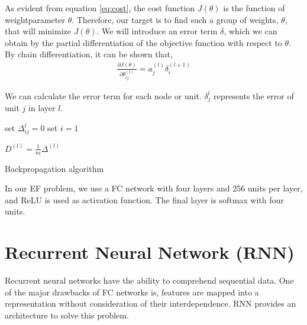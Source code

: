 As evident from equation \ref{eq:cost}, the cost function $J(\theta)$ is the function of weightparameter $\theta$. Therefore, our target is to find such a group of weights, $\theta$, that will minimize $J(\theta)$. We will introduce an error term $\delta$, which we can obtain by the partial differentiation of the objective function with respect to $\theta$. By chain differentiation, it can be shown that, 
\begin{align}
    \frac{\partial J(\theta)}{\partial \theta_{ij}^{(l)}} = a_{j}^{(l)} \delta_{i}^{(l+1)}
\end{align}

We can calculate the error term for each node or unit. $\delta_{j}^l$ represents the error of unit $j$ in layer $l$. 



\begin{algorithm}[H]
\SetAlgoLined
{}
 set $\Delta_{ij}^l=0$\;
 set $i=1$\;

 $D^{(l)}=\frac{1}{m}\Delta^{(l)}$\;

 \caption{Backpropagation algorithm}
\end{algorithm}
\vspace{+1cm}
In our EF problem, we use a FC network with four layers and 256 units per layer, and ReLU is used as activation function. The final layer is softmax with four units. 

\section{Recurrent Neural Network (RNN)}
\label{RNN}
Recurrent neural networks have the ability to comprehend sequential data. One of the major drawbacks of FC networks is, features are mapped into a representation without consideration of their interdependence. RNN provides an architecture to solve this problem. 

